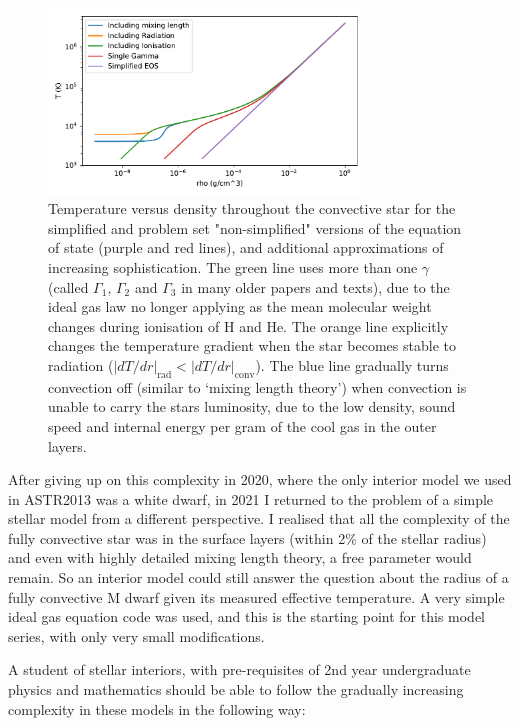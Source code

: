 \documentclass[12pt]{article}
\begin{document}
\begin{figure}[h]
\includegraphics[width=0.75\textwidth]{ConvectiveStarApprox.pdf}
\caption{Temperature versus density throughout the convective star for the simplified and problem set "non-simplified" versions of the equation of state (purple and red lines), and additional approximations of increasing sophistication. The green line uses more than one $\gamma$ (called $\Gamma_1$, $\Gamma_2$ and $\Gamma_3$ in many older papers and texts), due to the ideal gas law no longer applying as the mean molecular weight changes during ionisation of H and He. The orange line explicitly changes the temperature gradient when the star becomes stable to radiation ($|dT/dr|_\text{rad} < |dT/dr|_\text{conv}$). The blue line gradually turns convection off (similar to `mixing length theory') when convection is unable to carry the stars luminosity, due to the low density, sound speed and internal energy per gram of the cool gas in the outer layers.}
\label{figApprox}
\end{figure}

After giving up on this complexity in 2020, where the only interior model we used in ASTR2013 was a white dwarf, in 2021 I returned to the problem of a simple stellar model from a different perspective. I realised that all the complexity of the fully convective star was in the surface layers (within 2\% of the stellar radius) and even with highly detailed mixing length theory, a free parameter would remain. So an interior model could still answer the question about the radius of a fully convective M dwarf given its measured effective temperature. A very simple ideal gas equation code was used, and this is the starting point for this model series, with only very small modifications.

A student of stellar interiors, with pre-requisites of 2nd year undergraduate physics and mathematics should be able to follow the gradually increasing complexity in these models in the following way:
\end{document}
